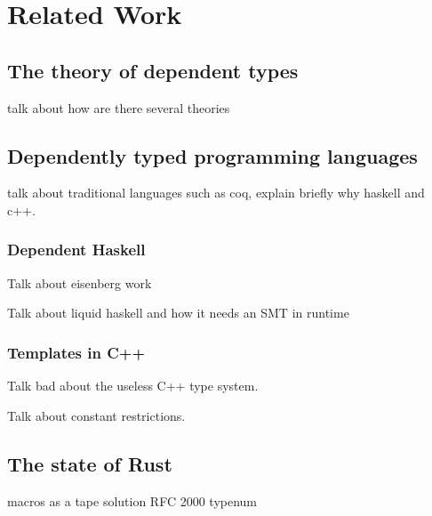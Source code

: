 \chapter{Related Work}
\label{chapter:related_work}

\section{The theory of dependent types}
talk about how are there several theories
\section{Dependently typed programming languages}
talk about traditional languages such as coq, explain briefly why haskell and c++.
\subsection{Dependent Haskell}
Talk about eisenberg work

Talk about liquid haskell and how it needs an SMT in runtime
\subsection{Templates in C++}
Talk bad about the useless C++ type system.

Talk about constant restrictions.

\section{The state of Rust}
macros as a tape solution
RFC 2000
typenum
